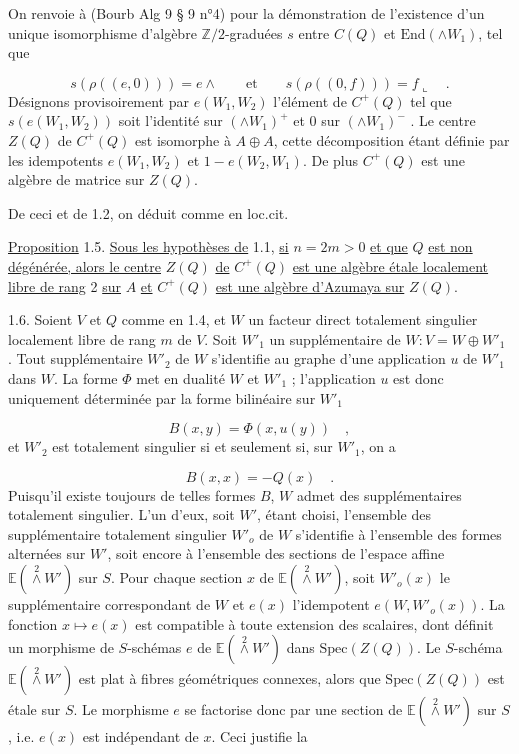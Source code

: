 On renvoie à (Bourb Alg 9 § 9 n°4) pour la démonstration de l'existence d'un unique isomorphisme d'algèbre $\mathbb{Z}/2$-graduées $s$ entre $C(Q)$ et $\mathrm{End}(\wedge W_1)$, tel que

\begin{equation*}
s(\rho((e,0))) = e \wedge \qquad \mbox{et} \qquad s(\rho((0,f))) = f \llcorner \quad .
\end{equation*}
Désignons provisoirement par $e(W_1,W_2)$ l'élément de $C^+(Q)$ tel que $s(e(W_1,W_2))$ soit l'identité sur $(\wedge W_1)^+$ et $0$ sur $(\wedge W_1)^-$ . Le centre $Z(Q)$ de $C^+(Q)$ est isomorphe à $A \oplus A$, cette décomposition étant définie par les idempotents $e(W_1,W_2)$ et $1 - e(W_2,W_1)$. De plus $C^+(Q)$ est une algèbre de matrice sur $Z(Q)$.

De ceci et de 1.2, on déduit comme en loc.cit.

\underline{Proposition} 1.5. \underline{Sous les hypothèses de} 1.1, \underline{si} $n = 2m > 0$ \underline{et que} $Q$ \underline{est non dégénérée, alors le centre} $Z(Q)$ \underline{de} $C^+(Q)$ \underline{est une algèbre étale localement libre de rang} 2 \underline{sur} $A$ \underline{et} $C^+(Q)$ \underline{est une algèbre d'Azumaya sur} $Z(Q)$.

1.6. Soient $V$ et $Q$ comme en 1.4, et $W$ un facteur direct totalement singulier localement libre de rang $m$ de $V$. Soit $W'_1$ un supplémentaire de $W : V = W \oplus W'_1$ . Tout supplémentaire $W'_2$ de $W$ s'identifie au graphe d'une application $u$ de $W'_1$ dans $W$. La forme $\Phi$ met en dualité $W$ et $W'_1$ ; l'application $u$ est donc uniquement déterminée par la forme bilinéaire sur $W'_1$ 



\begin{equation*}
 B(x,y) = \Phi(x,u(y)) \quad ,
\end{equation*}
et $W'_2$ est totalement singulier si et seulement si, sur $W'_1$, on a

\begin{equation*}
B(x,x) = - Q(x) \quad .
\end{equation*}
Puisqu'il existe toujours de telles formes $B$, $W$ admet des supplémentaires totalement singulier. L'un d'eux, soit $W'$, étant choisi, l'ensemble des supplémentaire totalement singulier $W'_o$ de $W$ s'identifie à l'ensemble des formes alternées sur $W'$, soit encore à l'ensemble des sections de l'espace affine $\mathbb{E}(\overset{2}{\wedge} W')$ sur $S$. Pour chaque section $x$ de $\mathbb{E}(\overset{2}{\wedge} W')$, soit $W'_o(x)$ le supplémentaire correspondant de $W$ et $e(x)$ l'idempotent $e(W, W'_o(x))$. La fonction $x \longmapsto e(x)$ est compatible à toute extension des scalaires, dont définit un morphisme de $S$-schémas $e$ de $\mathbb{E}(\overset{2}{\wedge} W')$ dans $\mathrm{Spec}(Z(Q))$. Le $S$-schéma $\mathbb{E}(\overset{2}{\wedge} W')$ est plat à fibres géométriques connexes, alors que $\mathrm{Spec}(Z(Q))$ est étale sur $S$. Le morphisme $e$ se factorise donc par une section de $\mathbb{E}(\overset{2}{\wedge} W')$ sur $S$, i.e. $e(x)$ est indépendant de $x$. Ceci justifie la

